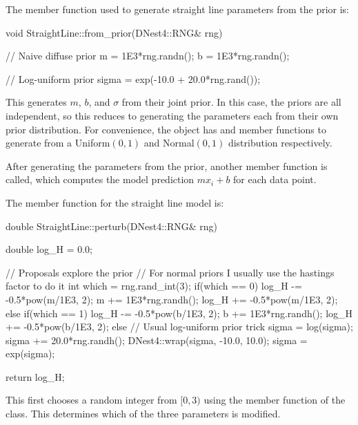 \documentclass[article]{jss}
\begin{document}


The member function used to generate straight line parameters from the
prior is:

\begin{CodeChunk}
\begin{CodeInput}
void StraightLine::from_prior(DNest4::RNG& rng)
{
   // Naive diffuse prior
   m = 1E3*rng.randn();
   b = 1E3*rng.randn();

   // Log-uniform prior
   sigma = exp(-10.0 + 20.0*rng.rand());
}
\end{CodeInput}
\end{CodeChunk}

This generates $m$, $b$, and $\sigma$ from their joint prior. In this case,
the priors are all independent, so this reduces to generating the parameters
each from their own prior distribution. For convenience, the  object
has  and  member functions to generate from
a Uniform$(0,1)$ and Normal$(0,1)$ distribution respectively.

After generating the parameters from the prior, another member function
 is called, which computes the model prediction
$mx_i + b$ for each data point.

The  member function for the straight line model is:
\begin{CodeChunk}
\begin{CodeInput}
double StraightLine::perturb(DNest4::RNG& rng)
{
	double log_H = 0.0;

	// Proposals explore the prior
	// For normal priors I usually use the hastings factor to do it
	int which = rng.rand_int(3);
	if(which == 0)
	{
		log_H -= -0.5*pow(m/1E3, 2);
		m += 1E3*rng.randh();
		log_H += -0.5*pow(m/1E3, 2);
	}
	else if(which == 1)
	{
		log_H -= -0.5*pow(b/1E3, 2);
		b += 1E3*rng.randh();
		log_H += -0.5*pow(b/1E3, 2);
	}
	else
	{
		// Usual log-uniform prior trick
		sigma = log(sigma);
		sigma += 20.0*rng.randh();
		DNest4::wrap(sigma, -10.0, 10.0);
		sigma = exp(sigma);
	}

	return log_H;
}
\end{CodeInput}
\end{CodeChunk}

This first chooses a random integer from $[0, 3)$ using the
 member function of the  class.
This determines which of the three parameters is modified.
\end{document}
